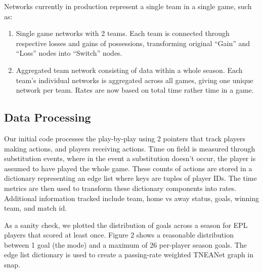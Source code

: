 Networks currently in production represent a single team in a single game, such as:

\begin{enumerate}
    \item Single game networks with 2 teams. Each team is connected through respective losses and gains of possessions, transforming original ``Gain'' and ``Loss'' nodes into ``Switch'' nodes.

    \item Aggregated team network consisting of data within a whole season. Each team's individual networks is aggregated across all games, giving one unique network per team. Rates are now based on total time rather time in a game. 
\end{enumerate}

\subsection{Data Processing}

Our initial code processes the play-by-play using 2 pointers that track players making actions, and players receiving actions. Time on field is measured through substitution events, where in the event a substitution doesn't occur, the player is assumed to have played the whole game. These counts of actions are stored in a dictionary representing an edge list where keys are tuples of player IDs. The time metrics are then used to transform these dictionary components into rates. Additional information tracked include team, home vs away status, goals, winning team, and match id. 

As a sanity check, we plotted the distribution of goals across a season for EPL players that scored at least once. Figure 2 shows a reasonable distribution between 1 goal (the mode) and a maximum of 26 per-player season goals. The edge list dictionary is used to create a passing-rate weighted TNEANet graph in snap. 




